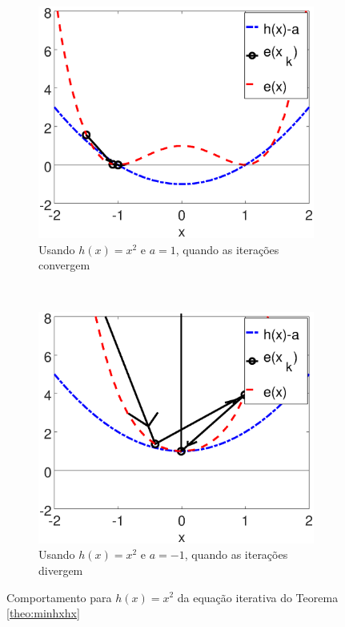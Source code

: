 \begin{figure}[!h]
    \centering
    \begin{subfigure}[b]{0.49\textwidth}
        \includegraphics[width=\textwidth]{chapters/minimization-hx/mfiles/hx_a/minimizando_hx_a_1.eps}
        \caption{Usando $h(x)=x^2$ e $a=1$, quando as iterações convergem}
        \label{fig:hxacasesa}
    \end{subfigure}
    ~ %
    \begin{subfigure}[b]{0.49\textwidth}
        \includegraphics[width=\textwidth]{chapters/minimization-hx/mfiles/hx_a/minimizando_hx_a_2.eps}
        \caption{Usando $h(x)=x^2$ e $a=-1$, quando as iterações divergem}
        \label{fig:hxacasesb}
    \end{subfigure}
    \caption{Comportamento para $h(x)=x^2$ da equação iterativa do Teorema \ref{theo:minhxhx}}
    \label{fig:hxacases}
\end{figure}

